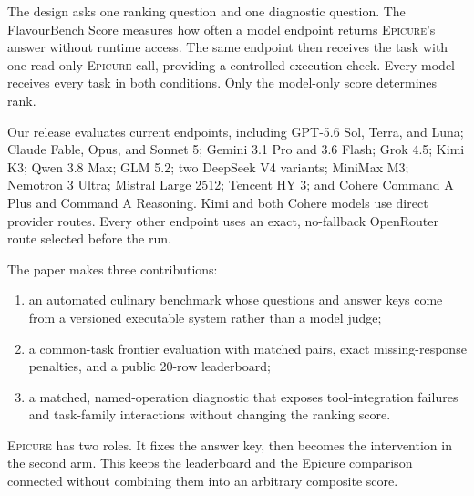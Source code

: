 \documentclass{article}
\newcommand{\epicure}{\textsc{Epicure}}
\begin{document}
The design asks one ranking question and one diagnostic question. The FlavourBench Score measures
how often a model endpoint returns \epicure{}'s answer without runtime access. The same endpoint
then receives the task with one read-only \epicure{} call, providing a controlled execution check.
Every model receives every task in both conditions. Only the model-only score determines rank.

Our release evaluates \FBModels{} current endpoints, including GPT-5.6 Sol, Terra, and Luna;
Claude Fable, Opus, and Sonnet 5; Gemini 3.1 Pro and 3.6 Flash; Grok 4.5; Kimi K3; Qwen 3.8 Max;
GLM 5.2; two DeepSeek V4 variants; MiniMax M3; Nemotron 3 Ultra; Mistral Large 2512; Tencent HY 3;
and Cohere Command A Plus and Command A Reasoning. Kimi and both Cohere models use direct provider
routes. Every other endpoint uses an exact, no-fallback OpenRouter route selected before the run.

The paper makes three contributions:

\begin{enumerate}[label=\arabic*.]
  \item an automated culinary benchmark whose questions and answer keys come from a versioned
  executable system rather than a model judge;
  \item a common-task frontier evaluation with \FBPairs{} matched pairs, exact missing-response
  penalties, and a public 20-row leaderboard;
  \item a matched, named-operation diagnostic that exposes tool-integration failures and
  task-family interactions without changing the ranking score.
\end{enumerate}

\epicure{} has two roles. It fixes the answer key, then becomes the intervention in the second arm.
This keeps the leaderboard and the Epicure comparison connected without combining them into an
arbitrary composite score.
\end{document}
